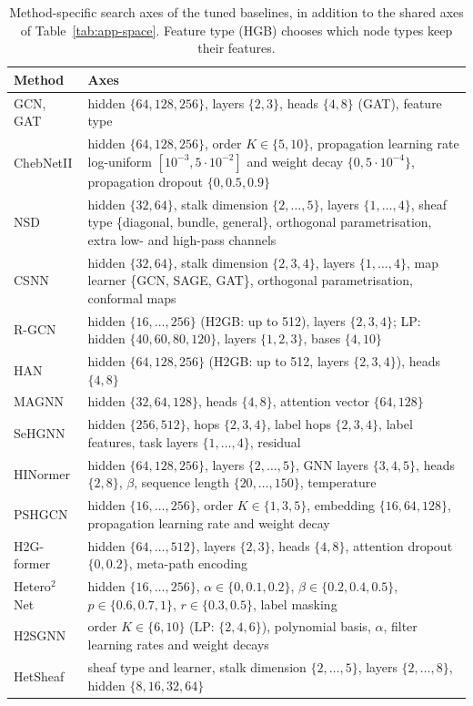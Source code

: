 \documentclass{article}
\begin{document}
\begin{table}[!htbp]
  \centering
  \caption{Method-specific search axes of the tuned baselines, in addition to the shared axes of Table~\ref{tab:app-space}. Feature type (HGB) chooses which node types keep their features.}
  \label{tab:app-base-space}
  \scriptsize
  \setlength{\tabcolsep}{3pt}
  \begin{tabular}{lp{}}
    \toprule
    Method & Axes \\
    \midrule
    GCN, GAT & hidden $\{64,128,256\}$, layers $\{2,3\}$, heads $\{4,8\}$ (GAT), feature type \\
    ChebNetII & hidden $\{64,128,256\}$, order $K\in\{5,10\}$, propagation learning rate log-uniform $[10^{-3},5\cdot10^{-2}]$ and weight decay $\{0,5\cdot10^{-4}\}$, propagation dropout $\{0,0.5,0.9\}$ \\
    NSD & hidden $\{32,64\}$, stalk dimension $\{2,\dots,5\}$, layers $\{1,\dots,4\}$, sheaf type \{diagonal, bundle, general\}, orthogonal parametrisation, extra low- and high-pass channels \\
    CSNN & hidden $\{32,64\}$, stalk dimension $\{2,3,4\}$, layers $\{1,\dots,4\}$, map learner \{GCN, SAGE, GAT\}, orthogonal parametrisation, conformal maps \\
    R-GCN & hidden $\{16,\dots,256\}$ (H2GB: up to 512), layers $\{2,3,4\}$; LP: hidden $\{40,60,80,120\}$, layers $\{1,2,3\}$, bases $\{4,10\}$ \\
    HAN & hidden $\{64,128,256\}$ (H2GB: up to 512, layers $\{2,3,4\}$), heads $\{4,8\}$ \\
    MAGNN & hidden $\{32,64,128\}$, heads $\{4,8\}$, attention vector $\{64,128\}$ \\
    SeHGNN & hidden $\{256,512\}$, hops $\{2,3,4\}$, label hops $\{2,3,4\}$, label features, task layers $\{1,\dots,4\}$, residual \\
    HINormer & hidden $\{64,128,256\}$, layers $\{2,\dots,5\}$, GNN layers $\{3,4,5\}$, heads $\{2,8\}$, $\beta$, sequence length $\{20,\dots,150\}$, temperature \\
    PSHGCN & hidden $\{16,\dots,256\}$, order $K\in\{1,3,5\}$, embedding $\{16,64,128\}$, propagation learning rate and weight decay \\
    H2G-former & hidden $\{64,\dots,512\}$, layers $\{2,3\}$, heads $\{4,8\}$, attention dropout $\{0,0.2\}$, meta-path encoding \\
    Hetero$^2$Net & hidden $\{16,\dots,256\}$, $\alpha\in\{0,0.1,0.2\}$, $\beta\in\{0.2,0.4,0.5\}$, $p\in\{0.6,0.7,1\}$, $r\in\{0.3,0.5\}$, label masking \\
    H2SGNN & order $K\in\{6,10\}$ (LP: $\{2,4,6\}$), polynomial basis, $\alpha$, filter learning rates and weight decays \\
    HetSheaf & sheaf type and learner, stalk dimension $\{2,\dots,5\}$, layers $\{2,\dots,8\}$, hidden $\{8,16,32,64\}$ \\
    \bottomrule
  \end{tabular}
\end{table}
\end{document}

